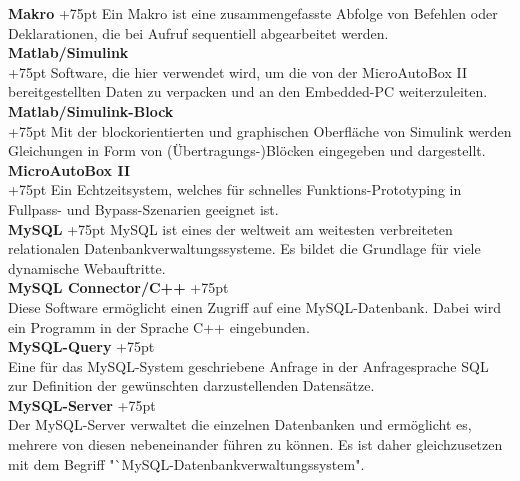 \documentclass[fontsize = 12pt, paper = a4]{scrreprt}
\begin{document}
\begin{spacing}{0.95} 

\textbf{Makro}
\hangindent+75pt 
\hspace*{9.75mm}
Ein Makro ist eine zusammengefasste Abfolge von Befehlen oder Deklarationen, die bei Aufruf sequentiell abgearbeitet werden.\\

\textbf{Matlab/Simulink} \\
\hangindent+75pt  
Software, die hier verwendet wird, um die von der MicroAutoBox II bereitgestellten Daten zu verpacken und an den Embedded-PC weiterzuleiten.\\

\textbf{Matlab/Simulink-Block} \\
\hangindent+75pt  
Mit der blockorientierten und graphischen Oberfläche von Simulink werden Gleichungen in Form von (Übertragungs-)Blöcken eingegeben und dargestellt.\\

\textbf{MicroAutoBox II} \\
\hangindent+75pt  
Ein Echtzeitsystem, welches für schnelles Funktions-Prototyping in Fullpass- und Bypass-Szenarien geeignet ist.\\


\textbf{MySQL}
\hangindent+75pt  
\hspace*{7.5mm}
MySQL ist eines der weltweit am weitesten verbreiteten relationalen Datenbankverwaltungssysteme. Es bildet die Grundlage für viele dynamische Webauftritte.\\

\textbf{MySQL Connector/C++}
\hangindent+75pt 
\\
Diese Software ermöglicht einen Zugriff auf eine MySQL-Datenbank. Dabei wird ein Programm in der Sprache C++ eingebunden.\\

\textbf{MySQL-Query}
\hangindent+75pt  
\\
Eine für das MySQL-System geschriebene Anfrage in der Anfragesprache SQL zur Definition der gewünschten darzustellenden Datensätze.\\

\textbf{MySQL-Server}
\hangindent+75pt 
\\
Der MySQL-Server verwaltet die einzelnen Datenbanken und ermöglicht es, mehrere von diesen nebeneinander führen zu können. Es ist daher gleichzusetzen mit dem Begriff "`MySQL-Datenbankverwaltungssystem".\\


\end{spacing}
\end{document}
